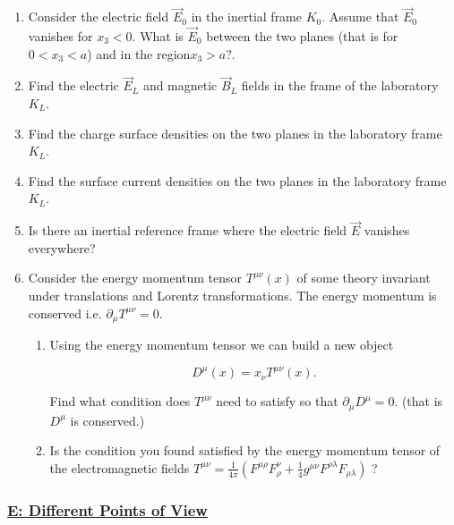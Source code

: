 \begin{enumerate}
	\item Consider the electric field $\vec{E}_{0}$ in the inertial frame $K_{0}$. Assume that $\vec{E}_{0}$ vanishes for $x_{3}<0 .$ What is $\vec{E}_{0}$ between the two planes (that is for $0<x_{3}<a$) and in the region$x_{3}>a ?$.
	\item Find the electric $\vec{E}_{L}$ and magnetic $\vec{B}_{L}$ fields in the frame of the laboratory $K_{L}$.
	\item Find the charge surface densities on the two planes in the laboratory frame $K_{L}$.
	\item Find the surface current densities on the two planes in the laboratory frame $K_{L}$.
	\item Is there an inertial reference frame where the electric field $\vec{E}$ vanishes everywhere?
	\item Consider the energy momentum tensor $T^{\mu \nu}(x)$ of some theory invariant under translations and Lorentz transformations. The energy momentum is conserved i.e. $\partial_{\mu} T^{\mu \nu}=0$.
	
	\begin{enumerate}
		\item Using the energy momentum tensor we can build a new object
		
		\begin{equation}
			D^{\mu}(x)=x_{\nu} T^{\mu \nu}(x).
		\end{equation}

		Find what condition does $T^{\mu \nu}$ need to satisfy so that $\partial_{\mu} D^{\mu}=0$. (that is $D^{\mu}$ is conserved.)
		\item Is the condition you found satisfied by the energy momentum tensor of the electromagnetic fields $T^{\mu \nu}=\frac{1}{4 \pi}\left(F^{\mu \rho} F_{\rho}^{\nu}+\frac{1}{4} g^{\mu \nu} F^{\rho \lambda} F_{\rho \lambda}\right)$ ?
	\end{enumerate}
\end{enumerate}

\subsubsection{\hyperref[E: Different Points of View]{E: Different Points of View}}

